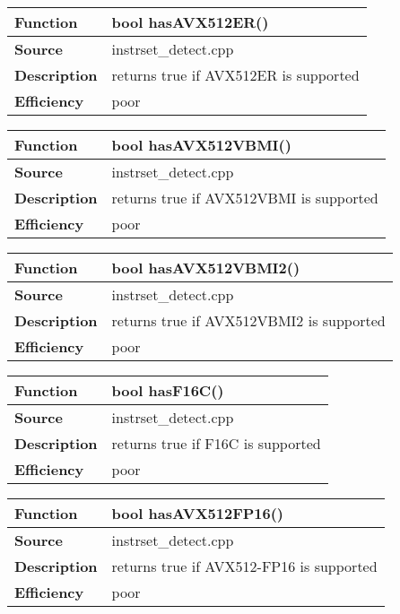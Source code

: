 \documentclass[vcl_manual.tex]{subfiles}
\begin{document}
\begin{tabular}{|p{25mm}|p{100mm}|}
\hline
\bfseries Function & bool hasAVX512ER() \\ \hline
\bfseries Source & instrset\_detect.cpp \\ \hline
\bfseries Description & returns true if AVX512ER is supported \\ \hline
 \bfseries Efficiency & poor \\ \hline
\end{tabular}

\begin{tabular}{|p{25mm}|p{100mm}|}
\hline
\bfseries Function & bool hasAVX512VBMI() \\ \hline
\bfseries Source & instrset\_detect.cpp \\ \hline
\bfseries Description & returns true if AVX512VBMI is supported \\ \hline
 \bfseries Efficiency & poor \\ \hline
\end{tabular}

\begin{tabular}{|p{25mm}|p{100mm}|}
\hline
\bfseries Function & bool hasAVX512VBMI2() \\ \hline
\bfseries Source & instrset\_detect.cpp \\ \hline
\bfseries Description & returns true if AVX512VBMI2 is supported \\ \hline
 \bfseries Efficiency & poor \\ \hline
\end{tabular}

\begin{tabular}{|p{25mm}|p{100mm}|}
\hline
\bfseries Function & bool hasF16C() \\ \hline
\bfseries Source & instrset\_detect.cpp \\ \hline
\bfseries Description & returns true if F16C is supported \\ \hline
 \bfseries Efficiency & poor \\ \hline
\end{tabular}

\begin{tabular}{|p{25mm}|p{100mm}|}
\hline
\bfseries Function & bool hasAVX512FP16() \\ \hline
\bfseries Source & instrset\_detect.cpp \\ \hline
\bfseries Description & returns true if AVX512-FP16 is supported \\ \hline
 \bfseries Efficiency & poor \\ \hline
\end{tabular}
\end{document}
